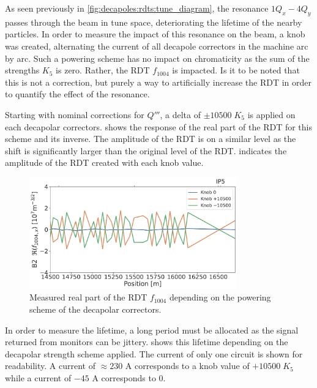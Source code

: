 As seen previously in \cref{fig:decapoles:rdts:tune_diagram}, the resonance $1Q_x - 4Q_y$ passes
through the beam in tune space, deteriorating the lifetime of the nearby particles.
In order to measure the impact of this resonance on the beam, a knob was created, alternating the 
current of all decapole correctors in the machine arc by arc. Such a powering scheme has no impact
on chromaticity as the sum of the strengths $K_5$ is zero. Rather, the RDT $f_{1004}$ is impacted.
Is it to be noted that this is not a correction, but purely a way to artificially increase the RDT
in order to quantify the effect of the resonance.

Starting with nominal corrections for $Q'''$, a delta of $\pm 10500\;K_5$ is applied on
each decapolar correctors.  shows the response of the
real part of the RDT for this scheme and its inverse. The amplitude of the RDT is on a similar level
as the shift is significantly larger than the original level of the RDT.
 indicates the amplitude of the RDT created with each
knob value.

\begin{figure}[!htb]
    \centering
    \includegraphics[width=0.8\textwidth]{./images/f1004/f1004x_knob_alt_lifetime_real.pdf}
    \caption{Measured real part of the RDT $f_{1004}$ depending on the powering scheme of the decapolar
    correctors.}
    \label{fig:decapoles:impact:alternating_knob}
\end{figure}

In order to measure the lifetime, a long period must be allocated as the signal returned from
monitors can be jittery.  shows this lifetime depending on
the decapolar strength scheme applied. The current of only one circuit is shown for readability.
A current of $\approx 230$ A corresponds to a knob value of $+10500\;K_5$ while a current of $-45$ A
corresponds to $0$.

